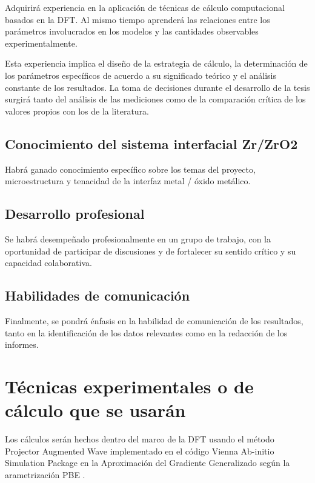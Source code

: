 Adquirirá experiencia en la aplicación de técnicas de cálculo computacional 
basados en la DFT. Al mismo tiempo aprenderá las relaciones entre los 
parámetros involucrados en los modelos y las cantidades observables 
experimentalmente.

Esta experiencia implica el diseño de la estrategia de cálculo, la 
determinación de los parámetros específicos de acuerdo a su significado teórico 
y el análisis constante de los resultados. La toma de decisiones durante el 
desarrollo de la tesis surgirá tanto del análisis de las mediciones como de la 
comparación crítica de los valores propios con los de la literatura.

\subsection{ Conocimiento del sistema interfacial Zr/ZrO2 }

Habrá ganado conocimiento específico sobre los temas del proyecto, 
microestructura y tenacidad de la interfaz metal / óxido metálico. 

\subsection{ Desarrollo profesional}

Se habrá desempeñado profesionalmente en un grupo de trabajo, con la 
oportunidad de participar de discusiones y de fortalecer su sentido crítico y 
su capacidad colaborativa.

\subsection{ Habilidades de comunicación }

Finalmente, se pondrá énfasis en la habilidad de comunicación de los 
resultados, tanto en la identificación de los datos relevantes como en la 
redacción de los informes. 


\section*{Técnicas experimentales o de cálculo que se usarán}

Los cálculos serán hechos dentro del marco de la DFT \cite{KohnSham65,
HohenbergKohn64} usando el método 
Projector Augmented Wave\cite{Bloch1994,Kresse1999}
implementado en el código Vienna Ab-initio 
Simulation Package\cite{Hafner2007,Hafner2008}
en la Aproximación del Gradiente Generalizado según la 
arametrización PBE \cite{PBE}. 

